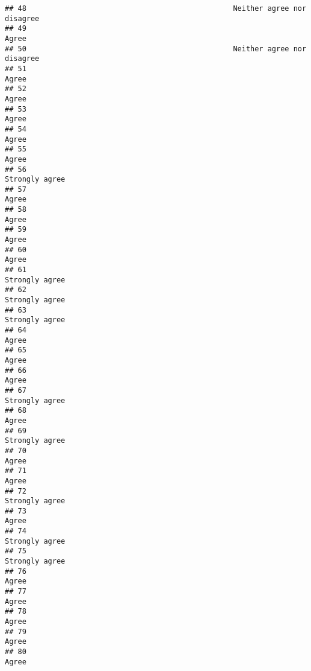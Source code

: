\documentclass[
]{article}
\begin{document}
\begin{verbatim}
## 48                                                Neither agree nor disagree
## 49                                                                     Agree
## 50                                                Neither agree nor disagree
## 51                                                                     Agree
## 52                                                                     Agree
## 53                                                                     Agree
## 54                                                                     Agree
## 55                                                                     Agree
## 56                                                            Strongly agree
## 57                                                                     Agree
## 58                                                                     Agree
## 59                                                                     Agree
## 60                                                                     Agree
## 61                                                            Strongly agree
## 62                                                            Strongly agree
## 63                                                            Strongly agree
## 64                                                                     Agree
## 65                                                                     Agree
## 66                                                                     Agree
## 67                                                            Strongly agree
## 68                                                                     Agree
## 69                                                            Strongly agree
## 70                                                                     Agree
## 71                                                                     Agree
## 72                                                            Strongly agree
## 73                                                                     Agree
## 74                                                            Strongly agree
## 75                                                            Strongly agree
## 76                                                                     Agree
## 77                                                                     Agree
## 78                                                                     Agree
## 79                                                                     Agree
## 80                                                                     Agree

\end{verbatim}
\end{document}
